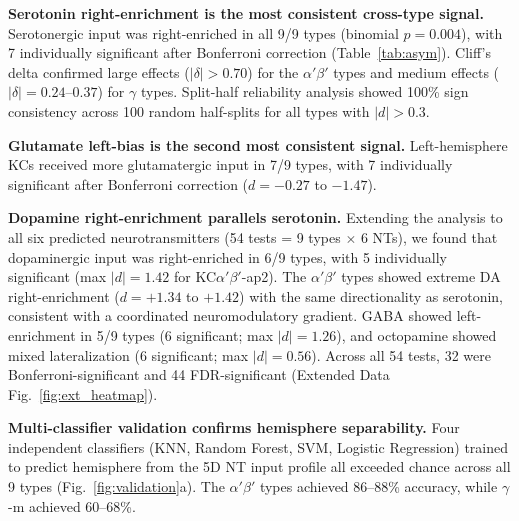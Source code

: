 \documentclass[10pt]{article}
\begin{document}
\textbf{Serotonin right-enrichment is the most consistent cross-type signal.} Serotonergic input was right-enriched in all 9/9 types (binomial $p = 0.004$), with 7 individually significant after Bonferroni correction (Table~\ref{tab:asym}). Cliff's delta confirmed large effects ($|\delta| > 0.70$) for the $\alpha'\beta'$ types and medium effects ($|\delta| = 0.24$--$0.37$) for $\gamma$ types. Split-half reliability analysis showed 100\% sign consistency across 100 random half-splits for all types with $|d| > 0.3$.

\textbf{Glutamate left-bias is the second most consistent signal.} Left-hemisphere KCs received more glutamatergic input in 7/9 types, with 7 individually significant after Bonferroni correction ($d = -0.27$ to $-1.47$).

\textbf{Dopamine right-enrichment parallels serotonin.} Extending the analysis to all six predicted neurotransmitters (54 tests = 9 types $\times$ 6 NTs), we found that dopaminergic input was right-enriched in 6/9 types, with 5 individually significant (max $|d| = 1.42$ for KC$\alpha'\beta'$-ap2). The $\alpha'\beta'$ types showed extreme DA right-enrichment ($d = +1.34$ to $+1.42$) with the same directionality as serotonin, consistent with a coordinated neuromodulatory gradient. GABA showed left-enrichment in 5/9 types (6 significant; max $|d| = 1.26$), and octopamine showed mixed lateralization (6 significant; max $|d| = 0.56$). Across all 54 tests, 32 were Bonferroni-significant and 44 FDR-significant (Extended Data Fig.~\ref{fig:ext_heatmap}).

\textbf{Multi-classifier validation confirms hemisphere separability.} Four independent classifiers (KNN, Random Forest, SVM, Logistic Regression) trained to predict hemisphere from the 5D NT input profile all exceeded chance across all 9 types (Fig.~\ref{fig:validation}a). The $\alpha'\beta'$ types achieved 86--88\% accuracy, while $\gamma$-m achieved 60--68\%.
\end{document}
